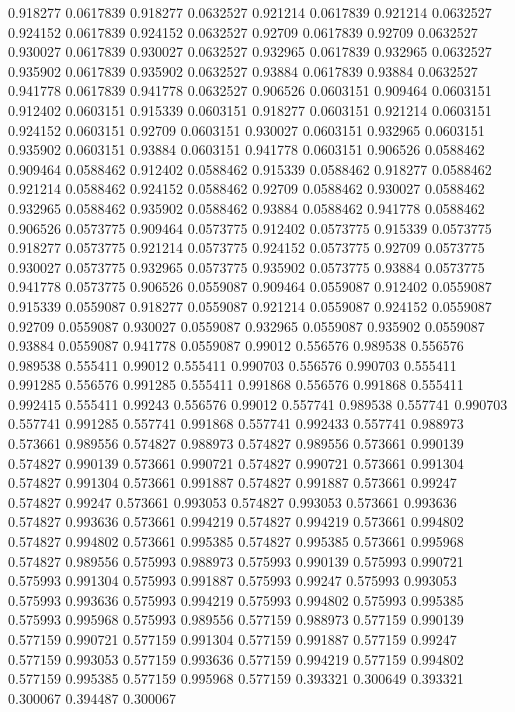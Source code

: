 0.918277 0.0617839
0.918277 0.0632527
0.921214 0.0617839
0.921214 0.0632527
0.924152 0.0617839
0.924152 0.0632527
0.92709 0.0617839
0.92709 0.0632527
0.930027 0.0617839
0.930027 0.0632527
0.932965 0.0617839
0.932965 0.0632527
0.935902 0.0617839
0.935902 0.0632527
0.93884 0.0617839
0.93884 0.0632527
0.941778 0.0617839
0.941778 0.0632527
0.906526 0.0603151
0.909464 0.0603151
0.912402 0.0603151
0.915339 0.0603151
0.918277 0.0603151
0.921214 0.0603151
0.924152 0.0603151
0.92709 0.0603151
0.930027 0.0603151
0.932965 0.0603151
0.935902 0.0603151
0.93884 0.0603151
0.941778 0.0603151
0.906526 0.0588462
0.909464 0.0588462
0.912402 0.0588462
0.915339 0.0588462
0.918277 0.0588462
0.921214 0.0588462
0.924152 0.0588462
0.92709 0.0588462
0.930027 0.0588462
0.932965 0.0588462
0.935902 0.0588462
0.93884 0.0588462
0.941778 0.0588462
0.906526 0.0573775
0.909464 0.0573775
0.912402 0.0573775
0.915339 0.0573775
0.918277 0.0573775
0.921214 0.0573775
0.924152 0.0573775
0.92709 0.0573775
0.930027 0.0573775
0.932965 0.0573775
0.935902 0.0573775
0.93884 0.0573775
0.941778 0.0573775
0.906526 0.0559087
0.909464 0.0559087
0.912402 0.0559087
0.915339 0.0559087
0.918277 0.0559087
0.921214 0.0559087
0.924152 0.0559087
0.92709 0.0559087
0.930027 0.0559087
0.932965 0.0559087
0.935902 0.0559087
0.93884 0.0559087
0.941778 0.0559087
0.99012 0.556576
0.989538 0.556576
0.989538 0.555411
0.99012 0.555411
0.990703 0.556576
0.990703 0.555411
0.991285 0.556576
0.991285 0.555411
0.991868 0.556576
0.991868 0.555411
0.992415 0.555411
0.99243 0.556576
0.99012 0.557741
0.989538 0.557741
0.990703 0.557741
0.991285 0.557741
0.991868 0.557741
0.992433 0.557741
0.988973 0.573661
0.989556 0.574827
0.988973 0.574827
0.989556 0.573661
0.990139 0.574827
0.990139 0.573661
0.990721 0.574827
0.990721 0.573661
0.991304 0.574827
0.991304 0.573661
0.991887 0.574827
0.991887 0.573661
0.99247 0.574827
0.99247 0.573661
0.993053 0.574827
0.993053 0.573661
0.993636 0.574827
0.993636 0.573661
0.994219 0.574827
0.994219 0.573661
0.994802 0.574827
0.994802 0.573661
0.995385 0.574827
0.995385 0.573661
0.995968 0.574827
0.989556 0.575993
0.988973 0.575993
0.990139 0.575993
0.990721 0.575993
0.991304 0.575993
0.991887 0.575993
0.99247 0.575993
0.993053 0.575993
0.993636 0.575993
0.994219 0.575993
0.994802 0.575993
0.995385 0.575993
0.995968 0.575993
0.989556 0.577159
0.988973 0.577159
0.990139 0.577159
0.990721 0.577159
0.991304 0.577159
0.991887 0.577159
0.99247 0.577159
0.993053 0.577159
0.993636 0.577159
0.994219 0.577159
0.994802 0.577159
0.995385 0.577159
0.995968 0.577159
0.393321 0.300649
0.393321 0.300067
0.394487 0.300067
